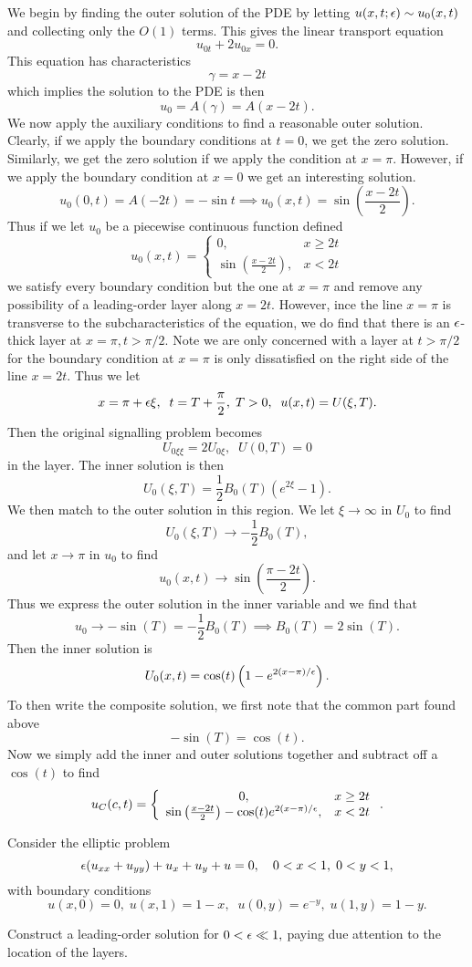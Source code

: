 We begin by finding the outer solution of the PDE by letting $u(x,t;\epsilon)\sim u_0(x,t)$ and collecting only the $O(1)$ terms. This gives the linear transport equation
$$u_{0t}+2u_{0x}=0.$$
This equation has characteristics
$$\gamma=x-2t$$
which implies the solution to the PDE is then
$$u_0=A(\gamma)=A(x-2t).$$
We now apply the auxiliary conditions to find a reasonable outer solution. Clearly, if we apply the boundary conditions at $t=0$, we get the zero solution. Similarly, we get the zero solution if we apply the condition at $x=\pi$. However, if we apply the boundary condition at $x=0$ we get an interesting solution.
$$u_0(0,t)=A(-2t)=-\sin t\implies u_0(x,t)=\sin(\frac{x-2t}{2}).$$
Thus if we let $u_0$ be a piecewise continuous function defined
$$u_0(x,t)=\left\{\begin{array}{cc}0,&x\geq 2t\\ \sin(\frac{x-2t}{2}),&x<2t\end{array}\right.$$
we satisfy every boundary condition but the one at $x=\pi$ and remove any possibility of a leading-order layer along $x=2t$. However, ince the line $x=\pi$ is transverse to the subcharacteristics of the equation,  we do find that there is an $\epsilon$-thick layer at $x=\pi, t>\pi/2.$ Note we are only concerned with a layer at $t>\pi/2$ for the boundary condition at $x=\pi$ is only dissatisfied on the right side of the line $x=2t.$ Thus we let
$$x=\pi+\epsilon\xi,\;\;t=T+\frac{\pi}{2},\;T>0,\;\;u(x,t)=U(\xi,T).$$
Then the original signalling problem becomes
$$U_{0\xi\xi}=2U_{0\xi},\;\;U(0,T)=0$$
in the layer. The inner solution is then
$$U_0(\xi,T)=\frac{1}{2}B_0(T)(e^{2\xi}-1).$$
We then match to the outer solution in this region. We let $\xi\to\infty$ in $U_0$ to find
$$U_0(\xi,T)\to-\frac{1}{2}B_0(T),$$
and let $x\to \pi$ in $u_0$ to find
$$u_0(x,t)\to \sin(\frac{\pi-2t}{2}).$$
Thus we express the outer solution in the inner variable and we find that
$$u_0\to -\sin(T)=-\frac{1}{2}B_0(T)\implies B_0(T)=2\sin(T).$$
Then the inner solution is
$$U_0(x,t)=\cos(t)\left(1-e^{2(x-\pi)/\epsilon}\right).$$
To then write the composite solution, we first note that the common part found above
$$-\sin(T)=\cos(t).$$
Now we simply add the inner and outer solutions together and subtract off a $\cos(t)$ to find
$$u_C(c,t)=\left\{\begin{array}{cc}0,&x\geq 2t\\ \sin\left(\frac{x-2t}{2}\right)-\cos(t)e^{2(x-\pi)/\epsilon},&x<2t\end{array}\right..$$


\item Consider the elliptic problem
\begin{equation*}
\epsilon(u_{xx} + u_{yy}) + u_x + u_y + u = 0, \quad 0<x<1, \; 0<y<1,
\end{equation*}
with boundary conditions
\begin{equation*}
u(x,0) = 0, \; u(x,1) = 1-x, \;\; u(0,y) = e^{-y}, \; u(1,y) = 1-y.
\end{equation*}
\benum
\item Construct a leading-order solution for $0 < \epsilon \ll 1,$ paying due attention to the location of the layers.

